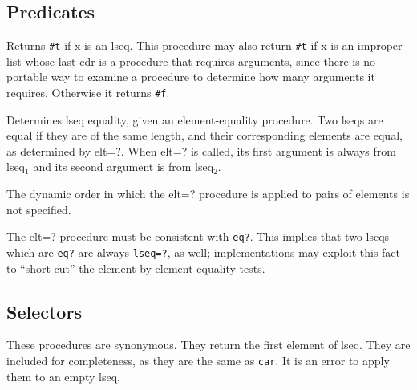 \subsection{{Predicates}}\label{predicates}

\begin{entry}{%
  }

  Returns \texttt{\#t} if x is an
  lseq. This procedure may also return \texttt{\#t} if x is an
  improper list whose last cdr is a procedure that requires arguments,
  since there is no portable way to examine a procedure to determine
  how many arguments it requires. Otherwise it returns \texttt{\#f}.
\end{entry}

\begin{entry}{%
  }

  Determines
  lseq equality, given an element-equality procedure. Two lseqs are
  equal if they are of the same length, and their corresponding
  elements are equal, as determined by elt=?. When elt=? is called,
  its first argument is always from lseq$_1$ and its second argument
  is from lseq$_2$.

  The dynamic order in which the elt=? procedure is applied to pairs
  of elements is not specified.

  The elt=? procedure must be consistent with \texttt{eq?}. This
  implies that two lseqs which are \texttt{eq?} are always
  \texttt{lseq=?}, as well; implementations may exploit this fact to
  ``short-cut'' the element-by-element equality tests.
\end{entry}

\subsection{{Selectors}}\label{selectors}

\begin{entry}{%
  }

  These procedures are synonymous. They return the first element of
  lseq.  They are included for completeness, as they are the same as
  \texttt{car}. It is an error to apply them to an empty lseq.
\end{entry}

